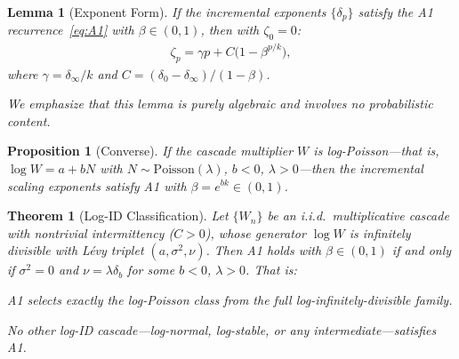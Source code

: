 \documentclass[10pt,a4paper]{amsart}
\newtheorem{lemma}{Lemma}
\newtheorem{proposition}{Proposition}
\newtheorem{theorem}{Theorem}
\begin{document}
\begin{lemma}[Exponent Form]\label{lem:exponent}
If the incremental exponents $\{\delta_p\}$ satisfy the A1
recurrence~\eqref{eq:A1} with $\beta \in (0,1)$, then with $\zeta_0
= 0$:
\begin{align}\label{eq:zeta}
  \zeta_p = \gamma p + C\bigl(1 - \beta^{p/k}\bigr),
  \tag{$**$}
\end{align}
where $\gamma = \delta_\infty / k$ and $C = (\delta_0 -
\delta_\infty)/(1 - \beta)$.

We emphasize that this lemma is purely algebraic and involves no
probabilistic content.
\end{lemma}

\begin{proposition}[Converse]\label{prop:converse}
If the cascade multiplier $W$ is log-Poisson---\allowbreak that is,
$\log W = a + bN$ with $N \sim \mathrm{Poisson}(\lambda)$, $b < 0$, $\lambda >
0$---then the incremental scaling exponents satisfy A1 with $\beta =
e^{bk} \in (0,1)$.
\end{proposition}

\begin{theorem}[Log-ID Classification]\label{thm:classification}
Let $\{W_n\}$ be an i.i.d.\ multiplicative cascade with nontrivial
intermittency ($C > 0$), whose generator $\log W$ is infinitely
divisible with L\'evy triplet $(a, \sigma^2, \nu)$.  Then A1 holds
with $\beta \in (0,1)$ if and only if $\sigma^2 = 0$ and $\nu =
\lambda\delta_b$ for some $b < 0$, $\lambda > 0$.  That is:
\begin{center}
\emph{A1 selects exactly the log-Poisson class from the full
log-infinitely-divisible family.}
\end{center}
No other log-ID cascade---log-normal, log-stable, or any
intermediate---satisfies A1.
\end{theorem}
\end{document}
